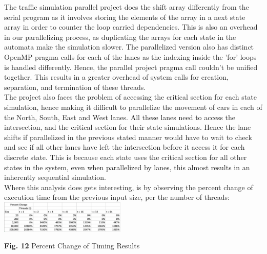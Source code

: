 \documentclass[conference]{IEEEtran}
\begin{document}
\hspace*{.2cm}The traffic simulation parallel project does the shift array differently from the serial program as it involves storing the elements of the array in a next state array in order to counter the loop carried dependencies. This is also an overhead in our parallelizing process, as duplicating the arrays for each state in the automata make the simulation slower. The parallelized version also has distinct OpenMP pragma calls for each of the lanes as the indexing inside the 'for' loops is handled differently. Hence, the parallel project pragma call couldn't be unified together. This results in a greater overhead of system calls for creation, separation, and termination of these threads. \\

\hspace*{.2cm}The project also faces the problem of accessing the critical section for each state simulation, hence making it difficult to parallelize the movement of cars in each of the North, South, East and West lanes. All these lanes need to access the intersection, and the critical section for their state simulations. Hence the lane shifts if parallelized in the previous stated manner would have to wait to check and see if all other lanes have left the intersection before it access it for each discrete state. This is because each state uses the critical section for all other states in the system, even when parallelized by lanes, this almost results in an inherently sequential simulation. \\

\hspace*{.2cm}Where this analysis does gets interesting, is by observing the percent change of execution time from the previous input size, per the number of threads: \\

\includegraphics[width=0.45\textwidth]{images/percentChange}
\begin{center}
	\textbf{Fig. 12} Percent Change of Timing Results \\
\end{center}
\end{document}
